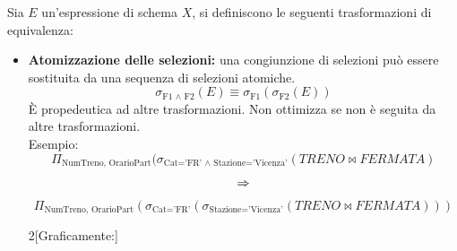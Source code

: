 \documentclass{report}
\begin{document}
Sia $E$ un'espressione di schema $X$, si definiscono le seguenti trasformazioni di equivalenza:
\begin{itemize}
    \item \textbf{Atomizzazione delle selezioni:} una congiunzione di selezioni può essere sostituita da una sequenza di selezioni atomiche.
\[ \sigma_\text{F1 $\wedge$ F2}(E) \equiv \sigma_\text{F1}(\sigma_\text{F2}(E))\] \`E propedeutica ad altre trasformazioni. Non ottimizza se non \`e seguita da altre trasformazioni. \\
Esempio:
\[ \Pi_{\text{NumTreno, OrarioPart}}(\sigma_{\text{Cat='FR' $\wedge$ Stazione='Vicenza'}}(TRENO \bowtie FERMATA) \]
\[ \Large \Rightarrow \]
\[ \Pi_{\text{NumTreno, OrarioPart}}(\sigma_{\text{Cat='FR'}}(\sigma_{\text{Stazione='Vicenza'}}(TRENO \bowtie FERMATA))) \]
\begin{multicols}{2}[Graficamente:]


\end{multicols}
\end{itemize}
\end{document}
